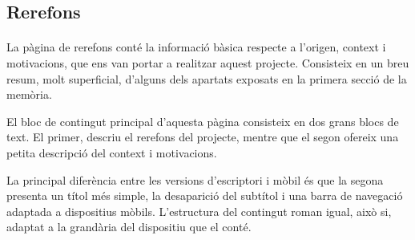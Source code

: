 \subsection{Rerefons}

    \paragraph{}
    La pàgina de rerefons conté la informació bàsica respecte a l'origen, context i motivacions, que ens van portar a realitzar aquest projecte. Consisteix en un breu resum, molt superficial, d’alguns dels apartats exposats en la primera secció de la memòria.

    El bloc de contingut principal d'aquesta pàgina consisteix en dos grans blocs de text. El primer, descriu el rerefons del projecte, mentre que el segon ofereix una petita descripció del context i motivacions.

    La principal diferència entre les versions d'escriptori i mòbil és que la segona presenta un títol més simple, la desaparició del subtítol i una barra de navegació adaptada a dispositius mòbils. L'estructura del contingut roman igual, això si, adaptat a la grandària del dispositiu que el conté. 
